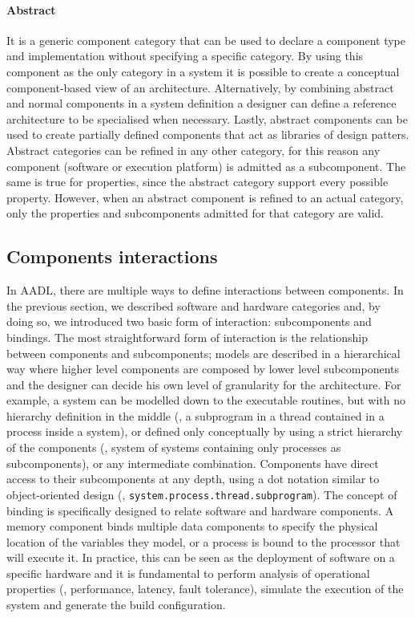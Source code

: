 \paragraph{Abstract} It is a generic component category that can be used to declare a component type and implementation without specifying a specific category. By using this component as the only category in a system it is possible to create a conceptual component-based view of an architecture. Alternatively, by combining abstract and normal components in a system definition a designer can define a reference architecture to be specialised when necessary. Lastly, abstract components can be used to create partially defined components that act as libraries of design patters. Abstract categories can be refined in any other category, for this reason any component (software or execution platform) is admitted as a subcomponent. The same is true for properties, since the abstract category support every possible property. However, when an abstract component is refined to an actual category, only the properties and subcomponents admitted for that category are valid.

\subsection{Components interactions}
In AADL, there are multiple ways to define interactions between components. In the previous section, we described software and hardware categories and, by doing so, we introduced  two basic form of interaction: subcomponents and bindings. The most straightforward form of interaction is the relationship between components and subcomponents; models are described in a hierarchical way where higher level components are composed by lower level subcomponents and the designer can decide his own level of granularity for the architecture. For example, a system can be modelled down to the executable routines, but with no hierarchy definition in the middle (\ie, a subprogram in a thread contained in a process inside a system), or defined only conceptually by using a strict hierarchy of the components (\ie, system of systems containing only processes as subcomponents), or any intermediate combination. Components have direct access to their subcomponents at any depth, using a dot notation similar to object-oriented design (\eg, \texttt{system.process.thread.subprogram}). The concept of binding is specifically designed to relate software and hardware components. A memory component binds multiple data components to specify the physical location of the variables they model, or a process is bound to the processor that will execute it. In practice, this can be seen as the deployment of software on a specific hardware and it is fundamental to perform analysis of operational properties (\eg, performance, latency, fault tolerance), simulate the execution of the system and generate the build configuration.

